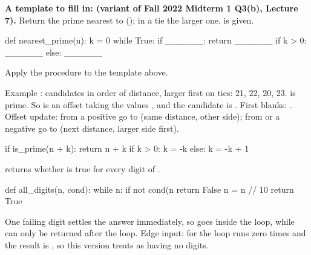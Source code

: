 \documentclass[10pt]{scrartcl}
\begin{document}
\textbf{A template to fill in:  (variant of Fall 2022 Midterm 1 Q3(b), Lecture 7).} Return the prime nearest to  (); in a tie the larger one.  is given.
\begin{py}
def nearest_prime(n):
    k = 0
    while True:
        if ______:
            return ______
        if k > 0:
            ______
        else:
            ______
\end{py}
\begin{example*}
Apply the procedure to the template above.
\begin{steps}
  \ii Example : candidates in order of distance, larger first on ties: 21, 22, 20, 23.  is prime.
  \ii So  is an offset taking the values , and the candidate is . First blanks: .
  \ii Offset update: from a positive  go to  (same distance, other side); from  or a negative  go to  (next distance, larger side first).
\end{steps}
\begin{py}
        if is_prime(n + k):
            return n + k
        if k > 0:
            k = -k
        else:
            k = -k + 1
\end{py}
\end{example*}

\begin{example*}
 returns whether  is true for every digit  of .
\begin{py}
def all_digits(n, cond):
    while n:
        if not cond(n %
            return False
        n = n // 10
    return True
\end{py}
One failing digit settles the answer immediately, so  goes inside the loop, while  can only be returned after the loop. Edge input: for  the loop runs zero times and the result is , so this version treats  as having no digits.
\end{example*}
\end{document}
